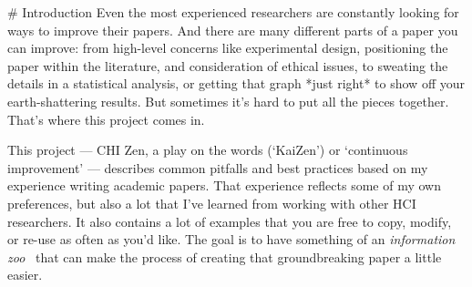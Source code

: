 

\begin{markdown}

# Introduction
Even the most experienced researchers are constantly looking for ways to improve their papers. And there are many different parts of a paper you can improve: from high-level concerns like experimental design, positioning the paper within the literature, and consideration of ethical issues, to sweating the details in a statistical analysis, or getting that graph *just right* to show off your earth-shattering results. But sometimes it's hard to put all the pieces together. That's where this project comes in. 
\end{markdown}

This project --- CHI Zen, a play on the words  (`KaiZen') or `continuous improvement' --- describes common pitfalls and best practices based on my experience writing academic papers. That experience reflects some of my own preferences, but also a lot that I've learned from working with other HCI researchers. It also contains a lot of examples that you are free to copy, modify, or re-use as often as you'd like. The goal is to have something of an \emph{information zoo}~\citep{heer2010tour} that can make the process of creating that groundbreaking paper a little easier. 

